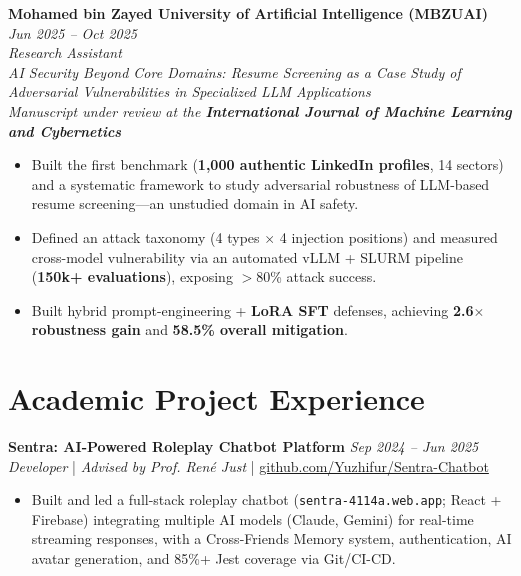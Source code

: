 \documentclass[a4paper,10pt]{article}
\begin{document}
\textbf{Mohamed bin Zayed University of Artificial Intelligence (MBZUAI)} \hfill \textit{Jun 2025 -- Oct 2025} \\
\textit{Research Assistant} \\
\textit{AI Security Beyond Core Domains: Resume Screening as a Case Study of Adversarial Vulnerabilities in Specialized LLM Applications} \\
\textit{Manuscript under review at the \textbf{International Journal of Machine Learning and Cybernetics}}
\begin{itemize}[noitemsep,leftmargin=*,topsep=2pt]
    \item Built the first benchmark (\textbf{1,000 authentic LinkedIn profiles}, 14 sectors) and a systematic framework to study adversarial robustness of LLM-based resume screening---an unstudied domain in AI safety.
    \item Defined an attack taxonomy (4 types $\times$ 4 injection positions) and measured cross-model vulnerability via an automated vLLM + SLURM pipeline (\textbf{150k+ evaluations}), exposing $>$80\% attack success.
    \item Built hybrid prompt-engineering + \textbf{LoRA SFT} defenses, achieving \textbf{2.6$\times$ robustness gain} and \textbf{58.5\% overall mitigation}.
\end{itemize}


\section*{Academic Project Experience}

\textbf{Sentra: AI-Powered Roleplay Chatbot Platform} \hfill \textit{Sep 2024 -- Jun 2025} \\
\textit{Developer} \hspace{0.2cm}|\hspace{0.2cm} \textit{Advised by Prof. Ren\'e Just} \hspace{0.2cm}|\hspace{0.2cm} \href{https://github.com/Yuzhifur/Sentra-Chatbot}{github.com/Yuzhifur/Sentra-Chatbot}
\begin{itemize}[noitemsep,leftmargin=*,topsep=2pt]
    \item Built and led a full-stack roleplay chatbot (\texttt{sentra-4114a.web.app}; React + Firebase) integrating multiple AI models (Claude, Gemini) for real-time streaming responses, with a Cross-Friends Memory system, authentication, AI avatar generation, and 85\%+ Jest coverage via Git/CI-CD.
\end{itemize}
\end{document}
